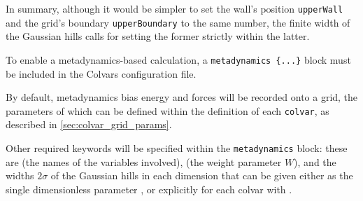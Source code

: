 In summary, although it would be simpler to set the wall's position \texttt{upperWall} and the grid's boundary \texttt{upperBoundary} to the same number, the finite width of the Gaussian hills calls for setting the former strictly within the latter.



To enable a metadynamics-based calculation, a \texttt{metadynamics \{...\}} block must be included in the Colvars configuration file.

By default, metadynamics bias energy and forces will be recorded onto a grid, the parameters of which can be defined within the definition of each \texttt{colvar}, as described in \ref{sec:colvar_grid_params}.

Other required keywords will be specified within the \texttt{metadynamics} block: these are  (the names of the variables involved),  (the weight parameter $W$), and the widths $2\sigma$ of the Gaussian hills in each dimension that can be given either as the single dimensionless parameter , or explicitly for each colvar with .

